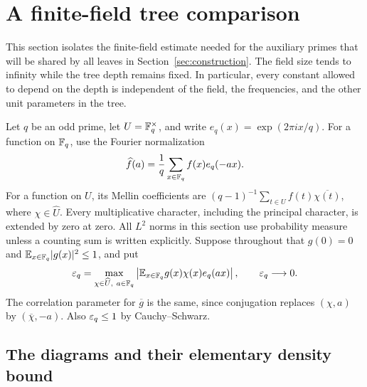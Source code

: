 \section{A finite-field tree comparison}\label{sec:tree}

This section isolates the finite-field estimate needed for the auxiliary
primes that will be shared by all leaves in Section~\ref{sec:construction}.
The field size tends to infinity while the tree depth remains
fixed.  In particular, every constant allowed to depend on the depth is
independent of the field, the frequencies, and the other unit parameters
in the tree.

Let $q$ be an odd prime, let $U=\mathbb F_q^\times$, and write
$e_q(x)=\exp(2\pi i x/q)$.  For a function on $\mathbb F_q$, use the Fourier
normalization
\[
 \widehat f(a)=\frac1q\sum_{x\in\mathbb F_q}f(x)e_q(-ax).
\]
For a function on $U$, its Mellin coefficients are
$(q-1)^{-1}\sum_{t\in U}f(t)\overline{\chi(t)}$, where
$\chi\in\widehat U$.  Every multiplicative character, including the
principal character, is extended by zero at zero.  All $L^2$ norms
in this section use probability measure unless a counting sum is
written explicitly.  Suppose throughout
that $g(0)=0$ and $\mathbb E_{x\in\mathbb F_q}|g(x)|^2\leq1$, and put
\begin{equation}\label{eq:src35}
 \varepsilon_q=\max_{\chi\in\widehat U,\ a\in\mathbb F_q}
       \left|\mathbb E_{x\in\mathbb F_q}g(x)\chi(x)e_q(ax)\right|,
 \qquad \varepsilon_q\longrightarrow0.
\end{equation}
The correlation parameter for $\overline g$ is the same, since conjugation
replaces $(\chi,a)$ by $(\overline\chi,-a)$.  Also $\varepsilon_q\leq1$ by
Cauchy--Schwarz.

\subsection{The diagrams and their elementary density bound}

